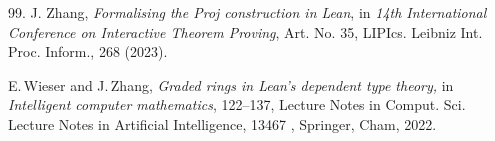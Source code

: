 \documentclass[graybox]{svmult}
\begin{document}
\begin{thebibliography}{99.}
J. Zhang, \textit{Formalising the Proj construction in Lean}, in {\it 14th International Conference on Interactive Theorem Proving}, Art. No. 35, LIPIcs. Leibniz Int. Proc. Inform., 268 (2023).

E.\,Wieser and J.\,Zhang, {\it Graded rings in Lean's dependent type theory,} in {\it Intelligent computer mathematics}, 122--137, Lecture Notes in Comput. Sci. Lecture Notes in Artificial Intelligence, 13467 , Springer, Cham, 2022.

\end{thebibliography}

%
\end{document}
